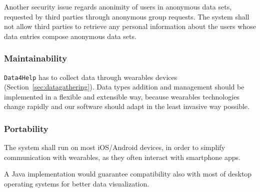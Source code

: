       Another security issue regards anonimity of users in anonymous data sets, requested by third parties through anonymous group requests. The system shall not allow third parties to retrieve any personal information about the users whose data entries compose anonymous data sets.

    \subsubsection{Maintainability}

      \texttt{Data4Help} has to collect data through wearables devices (Section~\ref{sec:datagathering}). Data types addition and management should be implemented in a flexible and extensible way, because wearables technologies change rapidly and our software should adapt in the least invasive way possible.

    \subsubsection{Portability}

      The system shall run on most iOS/Android devices, in order to simplify communication with wearables, as they often interact with smartphone apps.

      A Java implementation would guarantee compatibility also with most of desktop operating systems for better data visualization.
